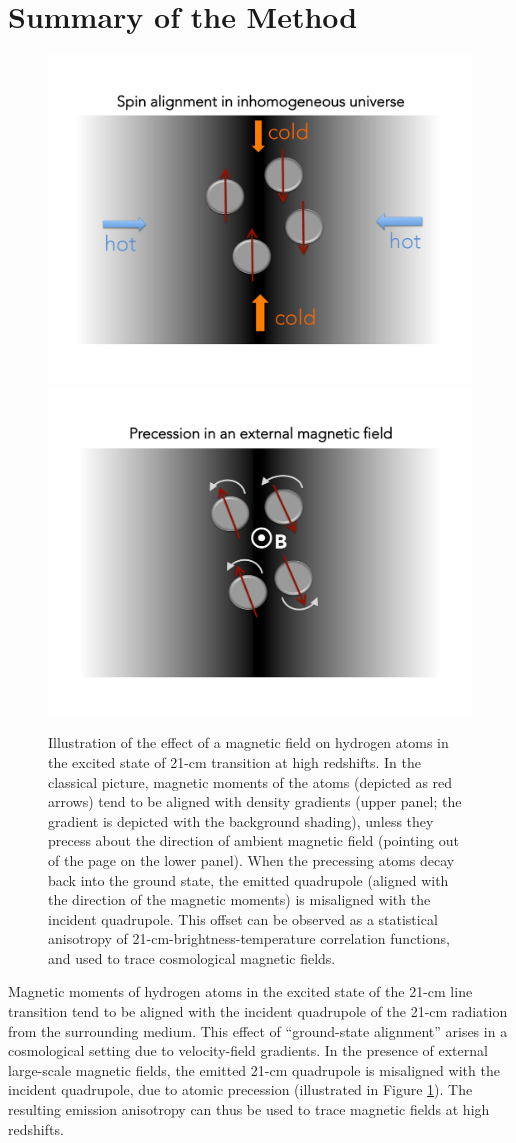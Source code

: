 \section{Summary of the Method}
\label{sec:method}

\begin{figure}
\centering
\includegraphics[width=.35\textwidth,keepaspectratio=true]{Slide2.pdf}
\includegraphics[width=.35\textwidth,keepaspectratio=true]{Slide3.pdf}
\caption{Illustration of the effect of a magnetic field on hydrogen atoms in the excited state of 21-cm transition at high redshifts. In the classical picture, magnetic moments of the atoms (depicted as red arrows) tend to be aligned with density gradients (upper panel; the gradient is depicted with the background shading), unless they precess about the direction of ambient magnetic field (pointing out of the page on the lower panel). When the precessing atoms decay back into the ground state, the emitted quadrupole (aligned with the direction of the magnetic moments) is misaligned with the incident quadrupole. This offset can be observed as a statistical anisotropy of 21-cm-brightness-temperature correlation functions, and used to trace cosmological magnetic fields.\label{fig:precession}}
\end{figure}
Magnetic moments of hydrogen atoms in the excited state of the 21-cm line transition tend to be aligned with the incident quadrupole of the 21-cm radiation from the surrounding medium. This effect of ``ground-state alignment'' \cite{Yan08,Yan12} arises in a cosmological setting due to velocity-field gradients. In the presence of external large-scale magnetic fields, the emitted 21-cm quadrupole is misaligned with the incident quadrupole, due to atomic precession (illustrated in Figure \ref{fig:precession}). The resulting emission anisotropy can thus be used to trace magnetic fields at high redshifts.


